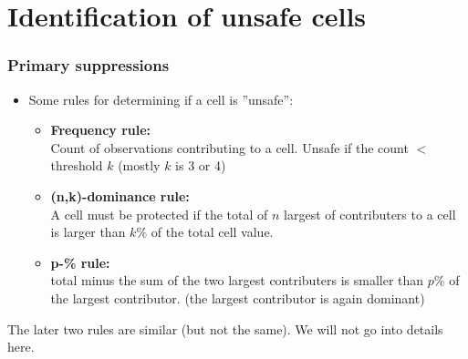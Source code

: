 \section{Identification of unsafe cells}
\begin{frame}\frametitle{Primary suppressions}
	\begin{itemize}
		\item Some rules for determining if a cell is ''unsafe'': \pause
		\begin{itemize}
			\item {\bf Frequency rule:} \\ Count of observations contributing to a cell. Unsafe if the count $<$ threshold $k$ (mostly $k$ is 3 or 4) \pause
			\item {\bf (n,k)-dominance rule:} \\ A cell must be protected if the total of $n$ largest of contributers to a cell is larger than $k\%$ of the total cell value.   \pause
			\item {\bf p-\% rule:} \\ total minus the sum of the two largest contributers is smaller than  $p \%$ of the largest contributor. (the largest contributor is again dominant) %
		\end{itemize}
	\end{itemize}
	
The later two rules are similar (but not the same). We will not go into details here.
\end{frame}
% 

